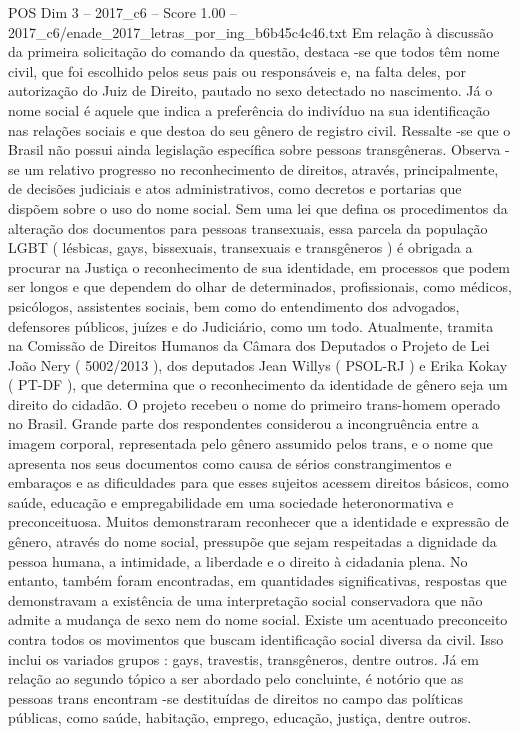 \begin{textsample}{POS Dim 3 – 2017\_c6 – Score 1.00 – 2017\_c6/enade\_2017\_letras\_por\_ing\_b6b45c4c46.txt}
Em relação à discussão da primeira solicitação do comando da questão, destaca -se que todos têm nome civil, que foi escolhido pelos seus pais ou responsáveis e, na falta deles, por autorização do Juiz de Direito, pautado no sexo detectado no nascimento.
Já o nome social é aquele que indica a preferência do indivíduo na sua identificação nas relações sociais e que destoa do seu gênero de registro civil.
Ressalte -se que o Brasil não possui ainda legislação específica sobre pessoas transgêneras.
Observa -se um relativo progresso no reconhecimento de direitos, através, principalmente, de decisões judiciais e atos administrativos, como decretos e portarias que dispõem sobre o uso do nome social.
Sem uma lei que defina os procedimentos da alteração dos documentos para pessoas transexuais, essa parcela da população LGBT ( lésbicas, gays, bissexuais, transexuais e transgêneros ) é obrigada a procurar na Justiça o reconhecimento de sua identidade, em processos que podem ser longos e que dependem do olhar de determinados, profissionais, como médicos, psicólogos, assistentes sociais, bem como do entendimento dos advogados, defensores públicos, juízes e do Judiciário, como um todo.
Atualmente, tramita na Comissão de Direitos Humanos da Câmara dos Deputados o Projeto de Lei João Nery ( 5002/2013 ), dos deputados Jean Willys ( PSOL-RJ ) e Erika Kokay ( PT-DF ), que determina que o reconhecimento da identidade de gênero seja um direito do cidadão.
O projeto recebeu o nome do primeiro trans-homem operado no Brasil.
Grande parte dos respondentes considerou a incongruência entre a imagem corporal, representada pelo gênero assumido pelos trans, e o nome que apresenta nos seus documentos como causa de sérios constrangimentos e embaraços e as dificuldades para que esses sujeitos acessem direitos básicos, como saúde, educação e empregabilidade em uma sociedade heteronormativa e preconceituosa.
Muitos demonstraram reconhecer que a identidade e expressão de gênero, através do nome social, pressupõe que sejam respeitadas a dignidade da pessoa humana, a intimidade, a liberdade e o direito à cidadania plena.
No entanto, também foram encontradas, em quantidades significativas, respostas que demonstravam a existência de uma interpretação social conservadora que não admite a mudança de sexo nem do nome social.
Existe um acentuado preconceito contra todos os movimentos que buscam identificação social diversa da civil.
Isso inclui os variados grupos : gays, travestis, transgêneros, dentre outros.
Já em relação ao segundo tópico a ser abordado pelo concluinte, é notório que as pessoas trans encontram -se destituídas de direitos no campo das políticas públicas, como saúde, habitação, emprego, educação, justiça, dentre outros.

\end{textsample}
